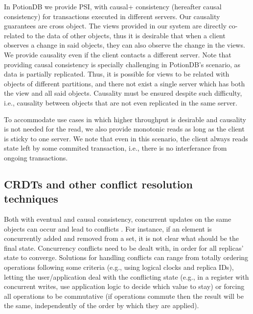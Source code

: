 In PotionDB we provide PSI, with causal+ consistency (hereafter causal consistency) for transactions executed in different servers. Our causality guarantees are cross object.
The views provided in our system are directly co-related to the data of other objects, thus it is desirable that when a client observes a change in said objects, they can also observe the change in the views.
We provide causality even if the client contacts a different server.
Note that providing causal consistency is specially challenging in PotionDB's scenario, as data is partially replicated.
Thus, it is possible for views to be related with objects of different partitions, and there not exist a single server which has both the view and all said objects.
Causality must be ensured despite such difficulty, i.e., causality between objects that are not even replicated in the same server.

To accommodate use cases in which higher throughput is desirable and causality is not needed for the read, we also provide monotonic reads as long as the client is sticky to one server.
We note that even in this scenario, the client always reads state left by some commited transaction, i.e., there is no interferance  from ongoing transactions.

\subsection{CRDTs and other conflict resolution techniques}

Both with eventual and causal consistency, concurrent updates on the same objects can occur and lead to conflicts \cite{understandingEC}.
For instance, if an element is concurrently added and removed from a set, it is not clear what should be the final state.
Concurrency conflicts need to be dealt with, in order for all replicas' state to converge.
Solutions for handling conflicts can range from totally ordering operations following some criteria (e.g., using logical clocks and replica IDs), letting the user/application deal with the conflicting state (e.g., in a register with concurrent writes, use application logic to decide which value to stay) or forcing all operations to be commutative (if operations commute then the result will be the same, independently of the order by which they are applied).

